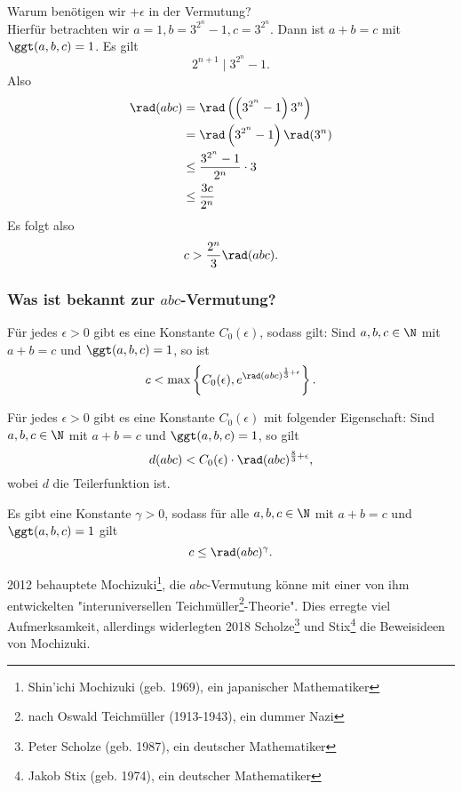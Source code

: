 \begin{rem*}
	Warum benötigen wir $+\epsilon$ in der Vermutung?\\
	Hierfür betrachten wir $a=1,b=3^{2^n}-1,c=3^{2^n}$. Dann ist $a+b=c$ mit $\ggt(a,b,c)=1$. Es gilt
	\[ 2^{n+1} \mid 3^{2^n}-1. \]
	Also
	\begin{align*}
		\rad(abc) &= \rad \left( \left( 3^{2^n}-1 \right) 3^n \right)\\
		&= \rad \left( 3^{2^n} -1 \right) \rad(3^n)\\
		&\leq \frac{3^{2^n}-1}{2^n} \cdot 3\\
		&\leq \frac{3c}{2^n}
	\end{align*}
	Es folgt also
	\[ c > \frac{2^n}{3} \rad(abc). \]
\end{rem*}

\subsubsection*{Was ist bekannt zur $abc$-Vermutung?}

\begin{thm*}
	Für jedes \( \epsilon>0 \) gibt es eine Konstante $C_0(\epsilon)$, sodass gilt: Sind $a,b,c \in \N$ mit $a+b=c$ und $\ggt(a,b,c)=1$, so ist
	\[ c < \max \left\{ C_0(\epsilon), e^{\rad(abc)^{\frac{1}{3}+\epsilon}} \right\}. \]
\end{thm*}

\begin{thm*}[Pastén, 2017]
	Für jedes $\epsilon>0$ gibt es eine Konstante $C_0(\epsilon)$ mit folgender Eigenschaft: Sind $a,b,c \in \N$ mit $a+b=c$ und $\ggt(a,b,c)=1$, so gilt
	\[ d(abc) < C_0(\epsilon) \cdot \rad(abc)^{\frac{8}{3}+\epsilon}, \]
	wobei $d$ die Teilerfunktion ist.
\end{thm*}

\begin{conj*}
	Es gibt eine Konstante $\gamma>0$, sodass für alle $a,b,c \in \N$ mit $a+b=c$ und $\ggt(a,b,c)=1$ gilt
	\[ c \leq \rad(abc)^\gamma. \]
\end{conj*}

2012 behauptete Mochizuki\footnote{Shin’ichi Mochizuki (geb. 1969), ein japanischer Mathematiker}, die $abc$-Vermutung könne mit einer von ihm entwickelten "interuniversellen Teichmüller\footnote{nach Oswald Teichmüller (1913-1943), ein dummer Nazi}-Theorie". Dies erregte viel Aufmerksamkeit, allerdings widerlegten 2018 Scholze\footnote{Peter Scholze (geb. 1987), ein deutscher Mathematiker} und Stix\footnote{Jakob Stix (geb. 1974), ein deutscher Mathematiker} die Beweisideen von Mochizuki.

